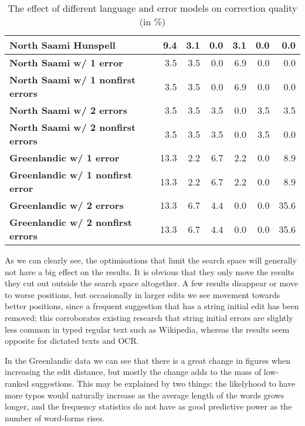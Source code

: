 \documentclass[a4paper,12pt]{article}
\begin{document}
\begin{table}
\begin{tabular}{|l|r|r|r|r|r|r|}
        \hline
        \bf North Saami Hunspell & 9.4 & 3.1 & 0.0 & 3.1 & 0.0 & 0.0 \\
        \hline
        \bf North Saami w/ 1 error & 3.5 & 3.5 & 0.0 & 6.9 & 0.0 & 0.0 \\
        \bf North Saami w/ 1 nonfirst errors & 3.5 & 3.5 & 0.0 & 6.9 & 0.0 & 0.0\\
        \bf North Saami w/ 2 errors & 3.5 & 3.5 & 3.5 & 0.0 & 3.5 & 3.5 \\
        \bf North Saami w/ 2 nonfirst errors & 3.5 & 3.5 & 3.5 & 0.0 & 3.5 & 0.0\\
        \hline
          \bf Greenlandic w/ 1 error & 13.3 & 2.2 & 6.7 & 2.2 & 0.0 & 8.9 \\
 \bf Greenlandic w/ 1 nonfirst error & 13.3 & 2.2 & 6.7 & 2.2 & 0.0 & 8.9 \\
         \bf Greenlandic w/ 2 errors & 13.3 & 6.7 & 4.4 & 0.0 & 0.0 & 35.6 \\
\bf Greenlandic w/ 2 nonfirst errors & 13.3 & 6.7 & 4.4 & 0.0 & 0.0 & 35.6 \\
        \hline
    \end{tabular}
    \caption{The effect of different language and error models on correction 
        quality (in \%)
    \label{table:quality}}
\end{table}

As we can clearly see, the optimisations that limit the search space will
generally not have a big effect on the results. It is obvious that they only
move the results they cut out outside the search space altogether. A few
results disappear or move to worse positions, but occasionally in larger edits
we see movement towards better positions, since a frequent suggestion that has
a string initial edit has been removed; this corroborates existing research
that string initial errors are slightly less common in typed regular text such
as Wikipedia, whereas the results seem opposite for dictated texts and OCR.

In the Greenlandic data we can see that there is a great change in figures
when increasing the edit distance, but mostly the change adds to the mass of
low-ranked suggestions. This may be explained by two things: the likelyhood
to have more typos would naturally increase as the average length of the words
grows longer, and the frequency statistics do not have as good predictive power
as the number of word-forms rises.
\end{document}
